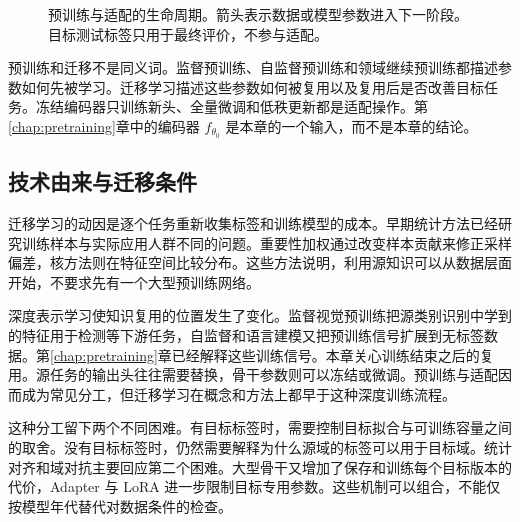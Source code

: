 \begin{figure}[htbp]
\centering
{}
\caption{预训练与适配的生命周期。箭头表示数据或模型参数进入下一阶段。目标测试标签只用于最终评价，不参与适配。}
\label{fig:transfer-lifecycle}
\end{figure}

预训练和迁移不是同义词。监督预训练、自监督预训练和领域继续预训练都描述参数如何先被学习。迁移学习描述这些参数如何被复用以及复用后是否改善目标任务。冻结编码器只训练新头、全量微调和低秩更新都是适配操作。第\ref{chap:pretraining}章中的编码器 $f_{\theta_0}$ 是本章的一个输入，而不是本章的结论。

\subsection{技术由来与迁移条件}
迁移学习的动因是逐个任务重新收集标签和训练模型的成本。早期统计方法已经研究训练样本与实际应用人群不同的问题。重要性加权通过改变样本贡献来修正采样偏差，核方法则在特征空间比较分布\cite{huang2007kmm}。这些方法说明，利用源知识可以从数据层面开始，不要求先有一个大型预训练网络。

深度表示学习使知识复用的位置发生了变化。监督视觉预训练把源类别识别中学到的特征用于检测等下游任务，自监督和语言建模又把预训练信号扩展到无标签数据。第\ref{chap:pretraining}章已经解释这些训练信号。本章关心训练结束之后的复用。源任务的输出头往往需要替换，骨干参数则可以冻结或微调。预训练与适配因而成为常见分工，但迁移学习在概念和方法上都早于这种深度训练流程\cite{pan2010transfer}。

这种分工留下两个不同困难。有目标标签时，需要控制目标拟合与可训练容量之间的取舍。没有目标标签时，仍然需要解释为什么源域的标签可以用于目标域。统计对齐和域对抗主要回应第二个困难\cite{long2015dan,ganin2016dann}。大型骨干又增加了保存和训练每个目标版本的代价，Adapter 与 LoRA 进一步限制目标专用参数\cite{houlsby2019adapter,hu2021lora}。这些机制可以组合，不能仅按模型年代替代对数据条件的检查。

